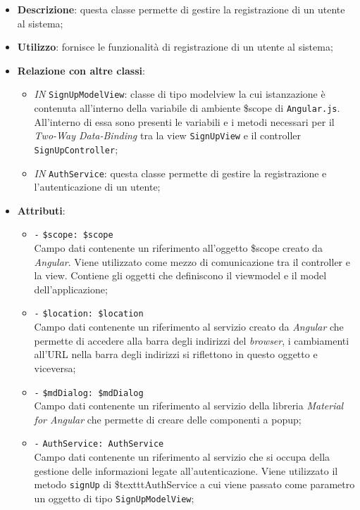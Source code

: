 \begin{itemize}
	\item \textbf{Descrizione}: questa classe permette di gestire la registrazione di un utente al sistema;
	\item \textbf{Utilizzo}: fornisce le funzionalità di registrazione di un utente al sistema;
	\item \textbf{Relazione con altre classi}:
	\begin{itemize}
		\item \textit{IN} \texttt{SignUpModelView}: classe di tipo modelview la cui istanzazione è contenuta all'interno della variabile di ambiente \$scope di \texttt{Angular.js}. All'interno di essa sono presenti le variabili e i metodi necessari per il \textit{Two-Way Data-Binding} tra la view \texttt{SignUpView} e il controller \texttt{SignUpController};
		\item \textit{IN} \texttt{AuthService}: questa classe permette di gestire la registrazione e l'autenticazione di un utente;
	\end{itemize}
	\item \textbf{Attributi}:
	\begin{itemize}
		\item \texttt{-} \texttt{\$scope: \$scope} \\
		Campo dati contenente un riferimento all’oggetto \$scope creato da \textit{Angular}. Viene utilizzato come mezzo di comunicazione tra il controller e la view. Contiene gli oggetti che definiscono il viewmodel e il model dell’applicazione;
		\item \texttt{-} \texttt{\$location: \$location} \\
		Campo dati contenente un riferimento al servizio creato da \textit{Angular} che permette di accedere alla barra degli indirizzi del \textit{browser}, i cambiamenti all’URL nella barra degli indirizzi si riflettono in questo oggetto e viceversa;
		\item \texttt{-} \texttt{\$mdDialog: \$mdDialog} \\
		Campo dati contenente un riferimento al servizio della libreria \textit{Material for Angular} che permette di creare delle componenti a popup;
		\item \texttt{-} \texttt{AuthService: AuthService} \\
		Campo dati contenente un riferimento al servizio che si occupa della gestione delle informazioni legate all’autenticazione. Viene utilizzato il metodo \texttt{signUp} di \$texttt{AuthService} a cui viene passato come parametro un oggetto di tipo \texttt{SignUpModelView};

\end{itemize}
\end{itemize}
